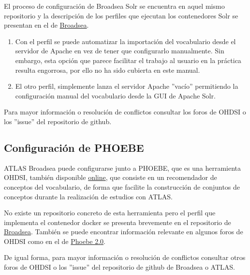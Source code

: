 El proceso de configuración de Broadsea Solr se encuentra en aquel mismo repositorio y la descripción de los perfiles que ejecutan los contenedores Solr se presentan en el de \href{https://github.com/OHDSI/Broadsea}{Broadsea}. 

\begin{enumerate}
    \item Con el perfil  se puede automatizar la importación del vocabulario desde el servidor de Apache en vez de tener que configurarlo manualmente. Sin embargo, esta opción que parece facilitar el trabajo al usuario en la práctica resulta engorrosa, por ello no ha sido cubierta en este manual.
    \item El otro perfil,  simplemente lanza el servidor Apache ''vacío'' permitiendo la configuración manual del vocabulario desde la GUI de Apache Solr.
\end{enumerate}

Para mayor información o resolución de conflictos consultar los foros de OHDSI o los ''issue'' del repositorio de github.

\subsection{Configuración de PHOEBE}

ATLAS Broadsea puede configurarse junto a PHOEBE, que es una herramienta OHDSI, también disponible \href{https://data.ohdsi.org/PHOEBE/}{online}, que consiste en un recomendador de conceptos del vocabulario, de forma que facilite la construcción de conjuntos de conceptos durante la realización de estudios con ATLAS. 

No existe un repositorio concreto de esta herramienta pero el perfil que implementa el contenedor docker se presenta brevemente en el repositorio de \href{https://github.com/OHDSI/Broadsea}{Broadsea}. También se puede encontrar información relevante en algunos foros de OHDSI como en el de \href{https://forums.ohdsi.org/t/phoebe-2-0/17410}{Phoebe 2.0}.

De igual forma, para mayor información o resolución de conflictos consultar otros foros de OHDSI o los ''issue'' del repositorio de github de Broadsea o ATLAS.